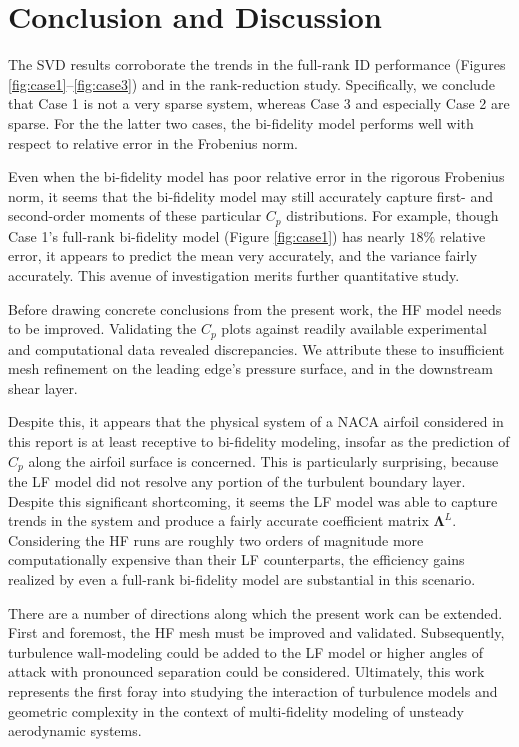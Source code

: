 \documentclass[11pt]{article}
\begin{document}
\section{Conclusion and Discussion}

The SVD results corroborate the trends in the full-rank ID performance (Figures \ref{fig:case1}--\ref{fig:case3}) and in the rank-reduction study. Specifically, we conclude that Case 1 is not a very sparse system, whereas Case 3 and especially Case 2 are sparse. For the the latter two cases, the bi-fidelity model performs well with respect to relative error in the Frobenius norm.

Even when the bi-fidelity model has poor relative error in the rigorous Frobenius norm, it seems that the bi-fidelity model may still accurately capture first- and second-order moments of these particular $C_p$ distributions. For example, though Case 1's full-rank bi-fidelity model (Figure \ref{fig:case1}) has nearly $18\%$ relative error, it appears to predict the mean very accurately, and the variance fairly accurately. This avenue of investigation merits further quantitative study.

Before drawing concrete conclusions from the present work, the HF model needs to be improved. Validating the $C_p$ plots against readily available experimental and computational data revealed discrepancies. We attribute these to insufficient mesh refinement on the leading edge's pressure surface, and in the downstream shear layer.

Despite this, it appears that the physical system of a NACA airfoil considered in this report is at least receptive to bi-fidelity modeling, insofar as the prediction of $C_p$ along the airfoil surface is concerned. This is particularly surprising, because the LF model did not resolve any portion of the turbulent boundary layer. Despite this significant shortcoming, it seems the LF model was able to capture trends in the system and produce a fairly accurate coefficient matrix $\bm{\Lambda}^L$. Considering the HF runs are roughly two orders of magnitude more computationally expensive than their LF counterparts, the efficiency gains realized by even a full-rank bi-fidelity model are substantial in this scenario.

There are a number of directions along which the present work can be extended. First and foremost, the HF mesh must be improved and validated. Subsequently, turbulence wall-modeling could be added to the LF model or higher angles of attack with pronounced separation could be considered. Ultimately, this work represents the first foray into studying the interaction of turbulence models and geometric complexity in the context of multi-fidelity modeling of unsteady aerodynamic systems.
\end{document}
